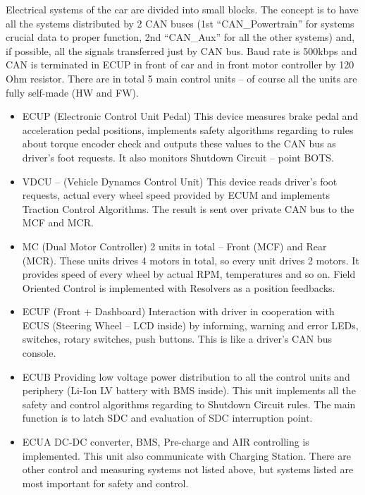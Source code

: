 
Electrical systems of the car are divided into small blocks. The concept is to have all the systems distributed by 2 CAN buses (1st “CAN\_Powertrain” for systems crucial data to proper function, 2nd “CAN\_Aux” for all the other systems) and, if possible, all the signals transferred just by CAN bus. Baud rate is 500kbps and CAN is terminated in ECUP in front of car and in front motor controller by 120 Ohm resistor. There are in total 5 main control units – of course all the units are fully self-made (HW and FW).

\begin{itemize}
\item	ECUP (Electronic Control Unit Pedal)
This device measures brake pedal and acceleration pedal positions, implements safety algorithms regarding to rules about torque encoder check and outputs these values to the CAN bus as driver’s foot requests. It also monitors Shutdown Circuit – point BOTS. 

\item	VDCU – (Vehicle Dynamcs Control Unit)
This device reads driver’s foot requests, actual every wheel speed provided by ECUM and implements Traction Control Algorithms. The result is sent over private CAN bus to the MCF and MCR. 

\item	MC (Dual Motor Controller)
2 units in total – Front (MCF) and Rear (MCR). These units drives 4 motors in total, so every unit drives 2 motors. It provides speed of every wheel by actual RPM, temperatures and so on. Field Oriented Control is implemented with Resolvers as a position feedbacks.

\item	ECUF (Front + Dashboard)
Interaction with driver in cooperation with ECUS (Steering Wheel – LCD inside) by informing, warning and error LEDs, switches, rotary switches, push buttons. This is like a driver’s CAN bus console. 

\item	ECUB
Providing low voltage power distribution to all the control units and periphery (Li-Ion LV battery with BMS inside). This unit implements all the safety and control algorithms regarding to Shutdown Circuit rules. The main function is to latch SDC and evaluation of SDC interruption point. 

\item	ECUA
DC-DC converter, BMS, Pre-charge and AIR controlling is implemented. This unit also communicate with Charging Station.
There are other control and measuring systems not listed above, but systems listed are most important for safety and control. 

\end{itemize}

